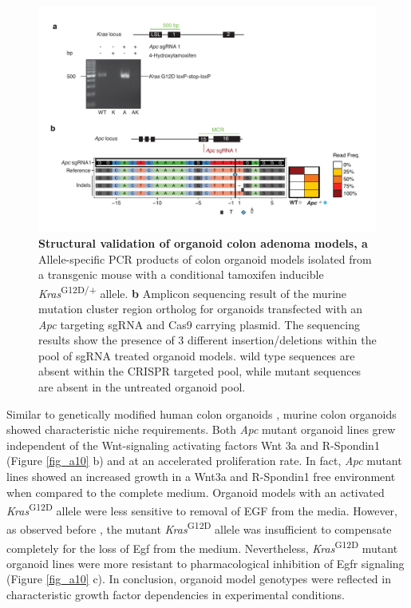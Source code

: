\begin{flushleft}
\begin{figure}[h]
\centering
\includegraphics[width=\textwidth,
                height=\textheight,
                keepaspectratio]{figures/adenomaprofiling/pdf/fig_1_1.pdf}
\caption[Structural validation of organoid colon adenoma models]{\textbf{Structural validation of organoid colon adenoma models, a} Allele-specific PCR products of colon organoid models isolated from a transgenic mouse with a conditional tamoxifen inducible \textit{Kras}\textsuperscript{G12D/+} allele.
\textbf{b} Amplicon sequencing result of the murine mutation cluster region ortholog for organoids transfected with an \textit{Apc} targeting sgRNA and Cas9 carrying plasmid. The sequencing results show the presence of 3 different insertion/deletions within the pool of sgRNA treated organoid models. wild type sequences are absent within the CRISPR targeted pool, while mutant sequences are absent in the untreated organoid pool.}
\label{fig_a11}
\end{figure}
\bigbreak

Similar to genetically modified human colon organoids \parencite{drostSequentialCancerMutations2015, matanoModelingColorectalCancer2015a}, murine colon organoids showed characteristic niche requirements. Both \textit{Apc} mutant organoid lines grew independent of the Wnt-signaling activating factors Wnt 3a and R-Spondin1 (Figure \ref{fig_a10} b) and at an accelerated proliferation rate. In fact, \textit{Apc} mutant lines showed an increased growth in a Wnt3a and R-Spondin1 free environment when compared to the complete medium. Organoid models with an activated \textit{Kras}\textsuperscript{G12D} allele were less sensitive to removal of EGF from the media. However, as observed before \parencite{drostSequentialCancerMutations2015}, the mutant \textit{Kras}\textsuperscript{G12D} allele was insufficient to compensate completely for the loss of Egf from the medium. Nevertheless, \textit{Kras}\textsuperscript{G12D} mutant organoid lines were more resistant to pharmacological inhibition of Egfr signaling (Figure \ref{fig_a10} c). In conclusion, organoid model genotypes were reflected in characteristic growth factor dependencies in experimental conditions.


\end{flushleft}
